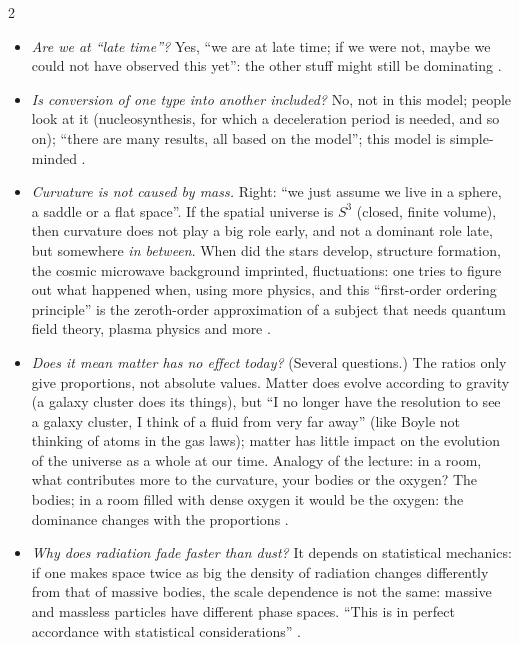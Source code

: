 \begin{paracol}{2}
\begin{coursenote}
\begin{itemize}
  \item \emph{Are we at ``late time''?} Yes, ``we are at late time; if we were not, maybe we could not have observed this yet'': the other stuff might still be dominating .
  \item \emph{Is conversion of one type into another included?} No, not in this model; people look at it (nucleosynthesis, for which a deceleration period is needed, and so on); ``there are many results, all based on the model''; this model is simple-minded .
  \item \emph{Curvature is not caused by mass.} Right: ``we just assume we live in a sphere, a saddle or a flat space''. If the spatial universe is $S^3$ (closed, finite volume), then curvature does not play a big role early, and not a dominant role late, but somewhere \emph{in between}. When did the stars develop, structure formation, the cosmic microwave background imprinted, fluctuations: one tries to figure out what happened when, using more physics, and this ``first-order ordering principle'' is the zeroth-order approximation of a subject that needs quantum field theory, plasma physics and more .
  \item \emph{Does it mean matter has no effect today?} (Several questions.) The ratios only give proportions, not absolute values. Matter does evolve according to gravity (a galaxy cluster does its things), but ``I no longer have the resolution to see a galaxy cluster, I think of a fluid from very far away'' (like Boyle not thinking of atoms in the gas laws); matter has little impact on the evolution of the universe as a whole at our time. Analogy of the lecture: in a room, what contributes more to the curvature, your bodies or the oxygen? The bodies; in a room filled with dense oxygen it would be the oxygen: the dominance changes with the proportions .
  \item \emph{Why does radiation fade faster than dust?} It depends on statistical mechanics: if one makes space twice as big the density of radiation changes differently from that of massive bodies, the scale dependence is not the same: massive and massless particles have different phase spaces. ``This is in perfect accordance with statistical considerations'' .
\end{itemize}
\end{coursenote}


\end{paracol}
